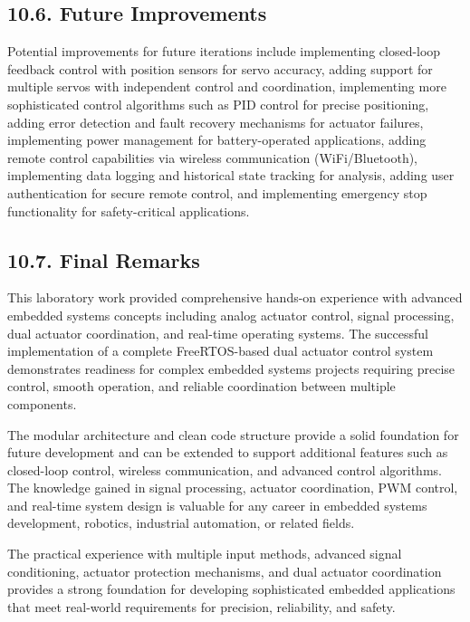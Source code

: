\documentclass[12pt]{article}
\begin{document}
\subsection*{10.6. Future Improvements}

Potential improvements for future iterations include implementing closed-loop feedback control with position sensors for servo accuracy, adding support for multiple servos with independent control and coordination, implementing more sophisticated control algorithms such as PID control for precise positioning, adding error detection and fault recovery mechanisms for actuator failures, implementing power management for battery-operated applications, adding remote control capabilities via wireless communication (WiFi/Bluetooth), implementing data logging and historical state tracking for analysis, adding user authentication for secure remote control, and implementing emergency stop functionality for safety-critical applications.

\subsection*{10.7. Final Remarks}

This laboratory work provided comprehensive hands-on experience with advanced embedded systems concepts including analog actuator control, signal processing, dual actuator coordination, and real-time operating systems. The successful implementation of a complete FreeRTOS-based dual actuator control system demonstrates readiness for complex embedded systems projects requiring precise control, smooth operation, and reliable coordination between multiple components.

The modular architecture and clean code structure provide a solid foundation for future development and can be extended to support additional features such as closed-loop control, wireless communication, and advanced control algorithms. The knowledge gained in signal processing, actuator coordination, PWM control, and real-time system design is valuable for any career in embedded systems development, robotics, industrial automation, or related fields.

The practical experience with multiple input methods, advanced signal conditioning, actuator protection mechanisms, and dual actuator coordination provides a strong foundation for developing sophisticated embedded applications that meet real-world requirements for precision, reliability, and safety.
\end{document}
